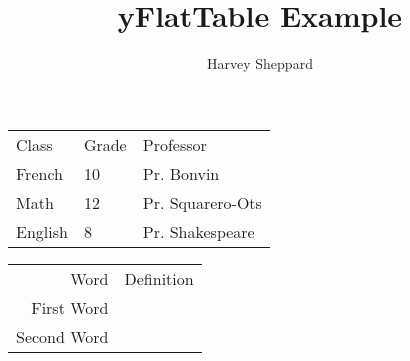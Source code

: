 \documentclass{article}
\title{yFlatTable Example}
\author{Harvey Sheppard}
\begin{document}
	
	\maketitle
	
	\begin{tabu}{ l l l }
		\tableHeaderStyle
		Class & Grade & Professor\\
		French & 10 & Pr. Bonvin\\
		Math & 12 & Pr. Squarero-Ots\\
		English & 8 & Pr. Shakespeare\\
	\end{tabu}
	\vspace*{\baselineskip}
	
	\begin{tabu}{r X[4]}
		\tableHeaderStyle
		Word & Definition\\
		First Word & \lipsum[1]\\
		Second Word & \lipsum[2]\\
	\end{tabu}
	
\end{document}
